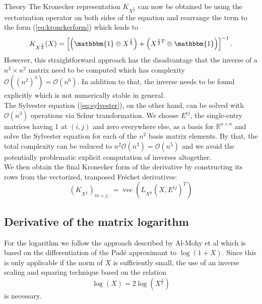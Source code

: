 \begin{chapter}{Theory}
The Kronecker representation $K_{X^{\frac{1}{2}}}$ can now be obtained be using the vectorization operator on both sides of the equation and rearrange the term
to the form (\ref{eq:kronckerform}) which leads to
\begin{equation}
    K_{X^{\frac{1}{2}}}(X)=\left[\left(\mathbbm{1}\otimes X^{\frac{1}{2}}\right)+\left(X^{\frac{1}{2}T}\otimes \mathbbm{1}\right) \right]^{-1}.
\end{equation}
However, this straightforward approach has the disadvantage that the inverse of a $n^2\times n^2$ matrix need to be computed which has complexity
$\mathcal{O}((n^2)^3)=\mathcal{O}(n^6)$. In addition to that, the inverse needs to be found explicitly which is not numerically stable in general.\\

The Sylvester equation (\ref{eq:sylvester}), on the other hand, can be solved with $\mathcal{O}(n^3)$ operations via Schur transformation. We choose $E^{ij}$, the single-entry
matrices having 1 at $(i,j)$ and zero everywhere else, as a basis for $\mathbb{R}^{n\times n}$ and solve the Sylvester equation for each of the $n^2$ 
basis matrix elements. By that, the total complexity can be reduced to $n^2\mathcal{O}(n^3)=\mathcal{O}(n^5)$ and we avoid the 
potentially problematic explicit computation of inverses altogether.\\

We then obtain the final Kronecker form of the derivative by constructing its rows from the vectorized, tranposed Fr\'{e}chet derivatives:
\begin{equation}
    \left(K_{X^{\frac{1}{2}}}\right)_{in + j,\cdot} = \operatorname{vec}\left(L_{X^{\frac{1}{2}}}(X,E^{ij})^T\right) 
\end{equation}

\subsection{Derivative of the matrix logarithm} %
\label{sub:Derivative of the matrix logarithm}
For the logarithm we follow the approach described by Al-Mohy et al \cite{almohy_frechetlog} which is based on the differentiation of the Pad\'{e} approximant to $\log(1+X)$.
Since this is only applicable if the norm of $X$ is sufficiently small, the  use of an inverse scaling and squaring technique based on the relation
\begin{equation}
    \log(X) = 2\log(X^{\frac{1}{2}})
\end{equation}
is necessary.\\


\end{chapter}
